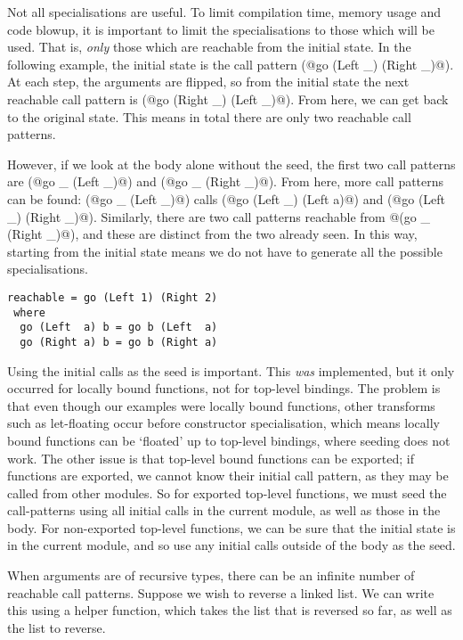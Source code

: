 Not all specialisations are useful.
To limit compilation time, memory usage and code blowup, it is important to limit the specialisations to those which will be used.
That is, \emph{only} those which are reachable from the initial state.
In the following example, the initial state is the call pattern (@go (Left _) (Right _)@).
At each step, the arguments are flipped, so from the initial state the next reachable call pattern is (@go (Right _) (Left _)@).
From here, we can get back to the original state.
This means in total there are only two reachable call patterns.

However, if we look at the body alone without the seed, the first two call patterns are (@go _ (Left _)@) and (@go _ (Right _)@).
From here, more call patterns can be found: (@go _ (Left _)@) calls (@go (Left _) (Left a)@) and (@go (Left _) (Right _)@).
Similarly, there are two call patterns reachable from @(go _ (Right _)@), and these are distinct from the two already seen.
In this way, starting from the initial state means we do not have to generate all the possible specialisations.

\begin{lstlisting}
reachable = go (Left 1) (Right 2)
 where
  go (Left  a) b = go b (Left  a)
  go (Right a) b = go b (Right a)
\end{lstlisting}


Using the initial calls as the seed is important.
This \emph{was} implemented, but it only occurred for locally bound functions, not for top-level bindings.
The problem is that even though our examples were locally bound functions, other transforms such as let-floating occur before constructor specialisation, which means locally bound functions can be `floated' up to top-level bindings, where seeding does not work.
The other issue is that top-level bound functions can be exported; if functions are exported, we cannot know their initial call pattern, as they may be called from other modules.
So for exported top-level functions, we must seed the call-patterns using all initial calls in the current module, as well as those in the body.
For non-exported top-level functions, we can be sure that the initial state is in the current module, and so use any initial calls outside of the body as the seed.

When arguments are of recursive types, there can be an infinite number of reachable call patterns.
Suppose we wish to reverse a linked list.
We can write this using a helper function, which takes the list that is reversed so far, as well as the list to reverse.


